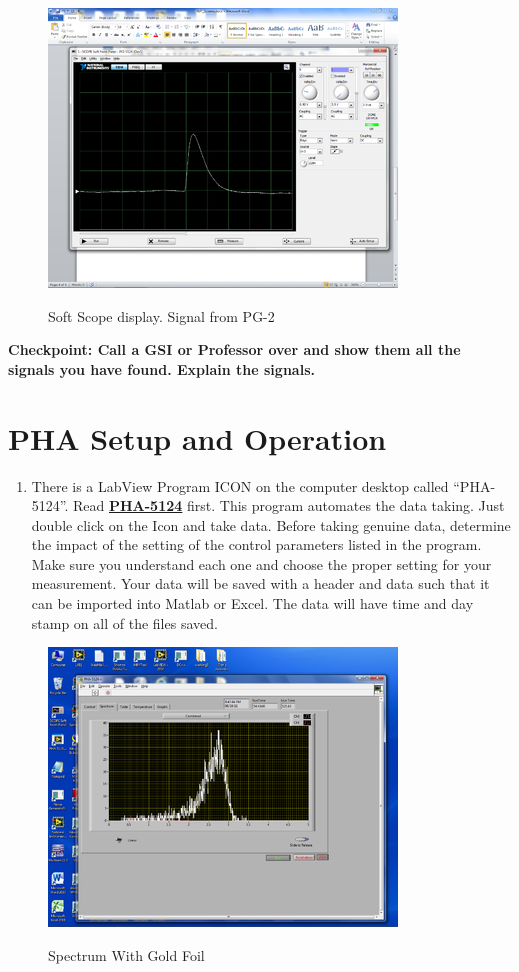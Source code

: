 \documentclass{../lab}
\begin{document}
\begin{figure}[h]
    \centering
    \href{http://experimentationlab.berkeley.edu/sites/default/files/images/350px-RUT_Soft_Scope.png}{\includegraphics[width=0.5\linewidth]{images/350px-RUT_Soft_Scope.png}}
    \caption{Soft Scope display. Signal from PG-2}
    \label{fig:SoftScopeDisplay}
\end{figure}

\textbf{Checkpoint: Call a GSI or Professor over and show them all the signals you have found. Explain the signals.}

\section{PHA Setup and Operation}

\begin{enumerate}
    \item There is a LabView Program ICON on the computer desktop called ``PHA-5124''. Read \href{http://experimentationlab.berkeley.edu/PHA-5124Program}{\textbf{PHA-5124}} first. This program automates the data taking. Just double click on the Icon and take data. Before taking genuine data, determine the impact of the setting of the control parameters listed in the program. Make sure you understand each one and choose the proper setting for your measurement. Your data will be saved with a header and data such that it can be imported into Matlab or Excel. The data will have time and day stamp on all of the files saved.

\end{enumerate}

\begin{figure}[h]
    \centering
    \href{http://experimentationlab.berkeley.edu/sites/default/files/images/350px-RUT_Spectrum_with_Foil.png}{\includegraphics[width=0.5\linewidth]{images/350px-RUT_Spectrum_with_Foil.png}}
    \caption{Spectrum With Gold Foil}
    \label{fig:350px-RUT_Spectrum_with_Foil}
\end{figure}
\end{document}
